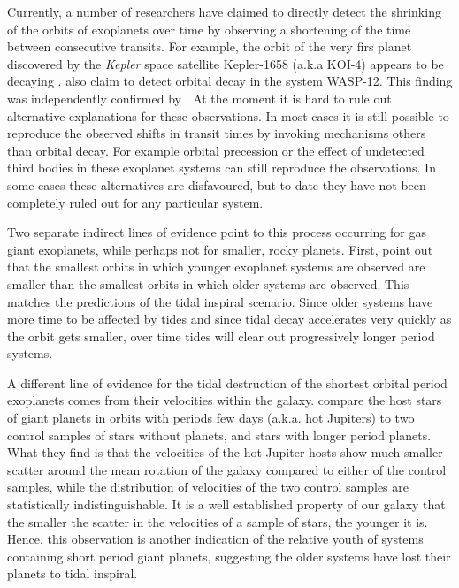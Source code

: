 Currently, a number of researchers have claimed to directly detect the shrinking
of the orbits of exoplanets over time by observing a shortening of the time
between consecutive transits. For example, the orbit of the very firs planet
discovered by the \textit{Kepler} space satellite Kepler-1658 (a.k.a KOI-4)
appears to be decaying \citep{Vissapragada_et_al_22}.
\citet{Maciejewski_et_al_16} also claim to detect orbital decay in the system
WASP-12. This finding was independently confirmed by \citet{Patra_et_al_17}. At
the moment it is hard to rule out alternative explanations for these
observations. In most cases it is still possible to reproduce the observed
shifts in transit times by invoking mechanisms others than orbital decay. For
example orbital precession or the effect of undetected third bodies in these
exoplanet systems can still reproduce the observations. In some cases these
alternatives are disfavoured, but to date they have not been completely ruled
out for any particular system.

Two separate indirect lines of evidence point to this process occurring for gas
giant exoplanets, while perhaps not for smaller, rocky planets. First,
\citet{Jackson_et_al_09} point out that the smallest orbits in which younger
exoplanet systems are observed are smaller than the smallest orbits in which
older systems are observed. This matches the predictions of the tidal inspiral
scenario. Since older systems have more time to be affected by tides and since
tidal decay accelerates very quickly as the orbit gets smaller, over time tides
will clear out progressively longer period systems.

A different line of evidence for the tidal destruction of the shortest orbital
period exoplanets comes from their velocities within the galaxy.
\citet{Hamer_Schlaufman_19} compare the host stars of giant planets in orbits
with periods few days (a.k.a.  hot Jupiters) to two control samples of stars
without planets, and stars with longer period planets. What they find is that
the velocities of the hot Jupiter hosts show much smaller scatter around the
mean rotation of the galaxy compared to either of the control samples, while the
distribution of velocities of the two control samples are statistically
indistinguishable. It is a well established property of our galaxy that the
smaller the scatter in the velocities of a sample of stars, the younger it is.
Hence, this observation is another indication of the relative youth of systems
containing short period giant planets, suggesting the older systems have lost
their planets to tidal inspiral.

